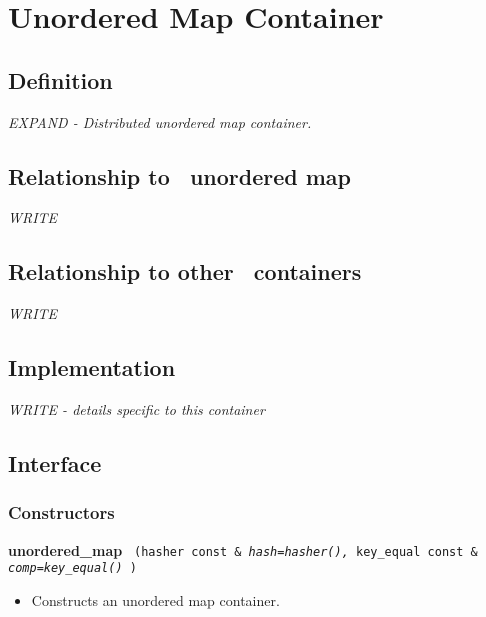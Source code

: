 
\section{ Unordered Map Container} \label{sec-unmap-cont}

\subsection{Definition}

\textit{EXPAND - Distributed unordered map container.}

\subsection{Relationship to \stl\ unordered map}

\textit{WRITE}

\subsection{Relationship to other \stapl\ containers}

\textit{WRITE}

\subsection{Implementation}

\textit{WRITE - details specific to this container}

\subsection{Interface} \label{sec-unmap-cont-inter}

\subsubsection{Constructors}

\noindent
\textbf{unordered\_map}%
\texttt{%
(hasher const \&
\textit{hash=hasher(),}%
key\_equal const \&
\textit{comp=key\_equal()}%
)
}

\begin{itemize}
\item
Constructs an unordered map container. 
\end{itemize}
 
